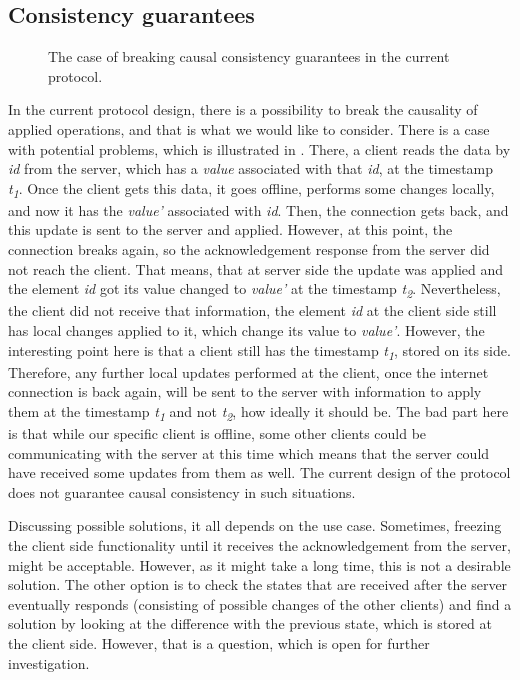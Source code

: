 \subsection*{Consistency guarantees}

\begin{figure}[!htb]
    \begin{center}
    \def\svgwidth{\linewidth}
    
    \caption {The case of breaking causal consistency guarantees in the current protocol.}
    \label{fig:final}
\end{center}
\end{figure}

In the current protocol design, there is a possibility to break the causality of applied operations, and that is what we would like to consider. There is a case with potential problems, which is illustrated in . There, a client reads the data by \textit{id} from the server, which has a \textit{value} associated with that \textit{id}, at the timestamp \textit{t\textsubscript{1}}. Once the client gets this data, it goes offline, performs some changes locally, and now it has the \textit{value'} associated with \textit{id}. Then, the connection gets back, and this update is sent to the server and applied. However, at this point, the connection breaks again, so the acknowledgement response from the server did not reach the client. That means, that at server side the update was applied and the element \textit{id} got its value changed to \textit{value'} at the timestamp \textit{t\textsubscript{2}}. Nevertheless, the client did not receive that information, the element \textit{id} at the client side still has local changes applied to it, which change its value to \textit{value'}. However, the interesting point here is that a client still has the timestamp \textit{t\textsubscript{1}}, stored on its side. Therefore, any further local updates performed at the client, once the internet connection is back again, will be sent to the server with information to apply them at the timestamp \textit{t\textsubscript{1}} and not \textit{t\textsubscript{2}}, how ideally it should be. The bad part here is that while our specific client is offline, some other clients could be communicating with the server at this time which means that the server could have received some updates from them as well. The current design of the protocol does not guarantee causal consistency in such situations. 

Discussing possible solutions, it all depends on the use case. Sometimes, freezing the client side functionality until it receives the acknowledgement from the server, might be acceptable. However, as it might take a long time, this is not a desirable solution. The other option is to check the states that are received after the server eventually responds (consisting of possible changes of the other clients) and find a solution by looking at the difference with the previous state, which is stored at the client side. However, that is a question, which is open for further investigation.